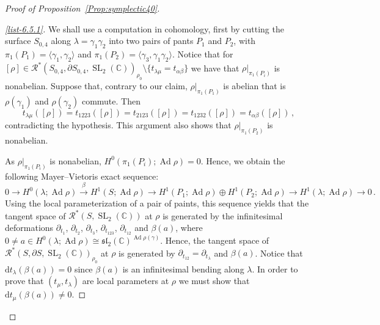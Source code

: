 \documentclass[11pt]{article}
\theoremstyle{definition}
\newenvironment{proofc}{\begin{proof}}{\end{proof}}
\numberwithin{equation}{section}
\numberwithin{figure}{section}
\numberwithin{table}{section}
\DeclareMathOperator{\SL}{SL}
\DeclareMathOperator{\Ad}{Ad}
\newcommand{\Rcal}{\mathcal{R}}
\newcommand{\Cbb}{\mathbb{C}}
\newcommand{\slfrk}{\mathfrak{sl}}
\newcommand*{\dd}{\mathrm{d}}
\begin{document}
\begin{proofc}[Proof of Proposition~\ref{Prop:symplectic40}]

\begin{proof}[\eqref{list-6.5.1}]
We shall use a computation in cohomology, first by cutting the surface $S_{0,4}$ along $\lambda=\gamma_1\gamma_2$ into two pairs of pants $P_1$ and $P_2$, with $\pi_1(P_1)=\langle \gamma_1,\gamma_2 \rangle $ and $\pi_1(P_2)=\langle \gamma_3,\gamma_1\gamma_2 \rangle $. Notice that for $[\rho]\in \Rcal^*(S_{0,4},\partial S_{0,4}, \SL_2(\Cbb))_{\rho_0}\setminus\{t_{\lambda\mu}=t_{\alpha\beta}\}$ we have that $\rho\vert_{ \pi_1(P_i)}$ is nonabelian. Suppose that, contrary to our claim, $\rho\vert_{ \pi_1(P_1)}$ is abelian that is $\rho(\gamma_1)$ and $\rho(\gamma_2)$ commute. Then
\[
t_{\lambda\mu}([\rho]) = t_{1223}([\rho]) = t_{2123}([\rho])=t_{1232}([\rho]) = t_{\alpha\beta}([\rho])\,,
\]
contradicting the hypothesis. This argument also shows that $\rho\vert_{ \pi_1(P_2)}$ is nonabelian.

As $\rho\vert_{\pi_1(P_i)}$ is nonabelian, $H^0(\pi_1(P_i);\Ad {\rho})=0$. Hence, we obtain the following Mayer--Vietoris exact sequence:
\[
0\to\!H^0(\lambda;\Ad {\rho})\overset \beta \to\!H^1(S;\Ad {\rho})\to\!H^1(P_1 ;\Ad {\rho})\oplus H^1(P_2; \Ad {\rho})\to H^1(\lambda ;\Ad {\rho})\to\!0\,.
\]
Using the local parameterization of a pair of paints, this sequence yields that the tangent space of $\Rcal^*(S,\SL_2(\Cbb))$ at $\rho$ is generated by the infinitesimal deformations $\partial_{t_1}$, $\partial_{t_2}$, $\partial_{t_3}$, $\partial_{t_{123}}$, $\partial_{t_{12}}$ and $\beta(a)$, where $0\neq a\in H^0(\lambda;\Ad {\rho})\cong \slfrk_2 (\Cbb)^{\Ad\rho(\gamma) }$. Hence, the tangent space of $\Rcal^*(S,\partial S,\SL_2(\Cbb))_{\rho_0}$ at $\rho$ is generated by $\partial_{t_{12}}=\partial_{t_\lambda}$ and $\beta(a)$. Notice that $\dd t_{\lambda} (\beta(a))=0$ since $\beta(a)$ is an infinitesimal bending along $\lambda$. In order to prove that $(t_\mu,t_\lambda)$ are local parameters at $\rho$ we must show that $\dd t_{\mu} (\beta(a))\neq 0 $.



\end{proof}
\end{proofc}
\end{document}
